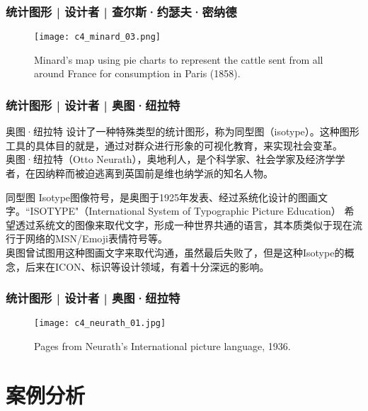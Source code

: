 \begin{frame}
  \frametitle{统计图形 | 设计者 | 查尔斯·约瑟夫·密纳德}
  \begin{figure}
    \centering
    \texttt{[image: c4\_minard\_03.png]}
    \caption{Minard's map using pie charts to represent the cattle sent from all around France for consumption in Paris (1858).}
  \end{figure}
\end{frame}

\begin{frame}
  \frametitle{统计图形 | 设计者 | 奥图·纽拉特}
  \begin{block}{奥图·纽拉特}
    设计了一种特殊类型的统计图形，称为同型图（isotype）。这种图形工具的具体目的就是，通过对群众进行形象的可视化教育，来实现社会变革。\\
    \vspace{0.5em}
奥图·纽拉特（Otto Neurath），奥地利人，是个科学家、社会学家及经济学学者，在因纳粹而被迫逃离到英国前是维也纳学派的知名人物。    
  \end{block}
  \pause
  \begin{block}{同型图}
    Isotype图像符号，是奥图于1925年发表、经过系统化设计的图画文字。``ISOTYPE"（International System of Typographic Picture Education） 希望透过系统文的图像来取代文字，形成一种世界共通的语言，其本质类似于现在流行于网络的MSN/Emoji表情符号等。\\
    \vspace{0.5em}
    奥图曾试图用这种图画文字来取代沟通，虽然最后失败了，但是这种Isotype的概念，后来在ICON、标识等设计领域，有着十分深远的影响。
  \end{block}
\end{frame}

\begin{frame}
  \frametitle{统计图形 | 设计者 | 奥图·纽拉特}
  \begin{figure}
    \centering
    \texttt{[image: c4\_neurath\_01.jpg]}
    \caption{Pages from Neurath's International picture language, 1936.}
  \end{figure}
\end{frame}

\section{案例分析}
